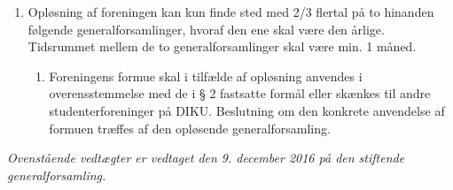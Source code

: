 \documentclass[a4paper]{article}
\newenvironment{stykenum}{
  \begin{enumerate}[%
    label=Stk.~\arabic*., ref=\theenumi~Stk.~\arabic*, start=2]
}{\end{enumerate}}
\begin{document}
\begin{enumerate}[resume*=afsnit]

\item Opløsning af foreningen kan kun finde sted med 2/3 flertal på to hinanden
følgende generalforsamlinger, hvoraf den ene skal være den årlige. Tidsrummet
mellem de to generalforsamlinger skal være min. 1 måned.

  \begin{stykenum}

  \item Foreningens formue skal i tilfælde af opløsning anvendes i
        over\-ensstemmelse med de i § 2 fastsatte formål eller skænkes til andre
        studenterforeninger på DIKU. Beslutning om den konkrete anvendelse af
        formuen træffes af den opløsende generalforsamling.

  \end{stykenum}

\end{enumerate}


\bigskip

\begin{center}

\emph{Ovenstående vedtægter er vedtaget den 9. december 2016 på den stiftende
generalforsamling.}

\end{center}
\end{document}
